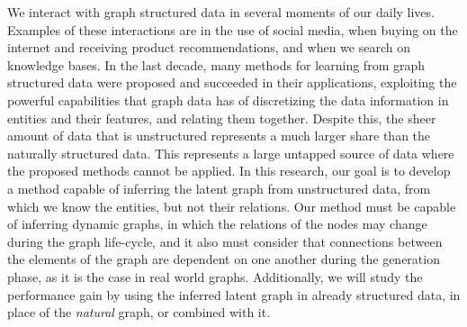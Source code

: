 We interact with graph structured data in several moments of our daily lives. Examples of these interactions are in the use of social media, when buying on the internet and receiving product recommendations, and when we search on knowledge bases.
%
In the last decade, many methods for learning from graph structured data were proposed and succeeded in their applications, exploiting the powerful capabilities that graph data has of discretizing the data information in entities and their features, and relating them together.
%
Despite this, the sheer amount of data that is unstructured represents a much larger share than the naturally structured data. This represents a large untapped source of data where the proposed methods cannot be applied.
%
In this research, our goal is to develop a method capable of inferring the latent graph from unstructured data, from which we know the entities, but not their relations.
%
Our method must be capable of inferring dynamic graphs, in which the relations of the nodes may change during the graph life-cycle, and it also must consider that  connections between the elements of the graph are dependent on one another during the generation phase, as it is the case in real world graphs.
%
Additionally, we will study the performance gain by using the inferred latent graph in already structured data, in place of the \emph{natural} graph, or combined with it.

